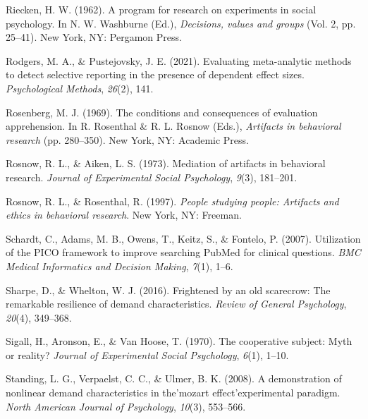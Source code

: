 \documentclass[
  man,floatsintext]{apa6}
\newlength{\cslhangindent}
\newlength{\cslentryspacingunit} %
\newenvironment{CSLReferences}[2] %
 {%
  \setlength{\parindent}{0pt}
  \ifodd #1
  \let\oldpar\par
  \def\par{\hangindent=\cslhangindent\oldpar}
  \fi
  \setlength{\parskip}{#2\cslentryspacingunit}
 }%
 {}
\begin{document}
\begin{CSLReferences}{1}{0}
\leavevmode{}%
Riecken, H. W. (1962). A program for research on experiments in social psychology. In N. W. Washburne (Ed.), \emph{Decisions, values and groups} (Vol. 2, pp. 25--41). New York, NY: Pergamon Press.

\leavevmode{}%
Rodgers, M. A., \& Pustejovsky, J. E. (2021). Evaluating meta-analytic methods to detect selective reporting in the presence of dependent effect sizes. \emph{Psychological Methods}, \emph{26}(2), 141.

\leavevmode{}%
Rosenberg, M. J. (1969). The conditions and consequences of evaluation apprehension. In R. Rosenthal \& R. L. Rosnow (Eds.), \emph{Artifacts in behavioral research} (pp. 280--350). New York, NY: Academic Press.

\leavevmode{}%
Rosnow, R. L., \& Aiken, L. S. (1973). Mediation of artifacts in behavioral research. \emph{Journal of Experimental Social Psychology}, \emph{9}(3), 181--201.

\leavevmode{}%
Rosnow, R. L., \& Rosenthal, R. (1997). \emph{People studying people: Artifacts and ethics in behavioral research}. New York, NY: Freeman.

\leavevmode{}%
Schardt, C., Adams, M. B., Owens, T., Keitz, S., \& Fontelo, P. (2007). Utilization of the PICO framework to improve searching PubMed for clinical questions. \emph{BMC Medical Informatics and Decision Making}, \emph{7}(1), 1--6.

\leavevmode{}%
Sharpe, D., \& Whelton, W. J. (2016). Frightened by an old scarecrow: The remarkable resilience of demand characteristics. \emph{Review of General Psychology}, \emph{20}(4), 349--368.

\leavevmode{}%
Sigall, H., Aronson, E., \& Van Hoose, T. (1970). The cooperative subject: Myth or reality? \emph{Journal of Experimental Social Psychology}, \emph{6}(1), 1--10.

\leavevmode{}%
Standing, L. G., Verpaelst, C. C., \& Ulmer, B. K. (2008). A demonstration of nonlinear demand characteristics in the'mozart effect'experimental paradigm. \emph{North American Journal of Psychology}, \emph{10}(3), 553--566.


\end{CSLReferences}
\end{document}
